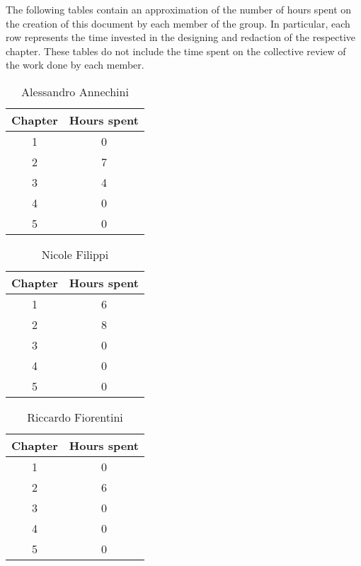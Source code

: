The following tables contain an approximation of the number of hours spent on the creation of this document by each member of the group. In particular, each row represents the time invested in the designing and redaction of the respective chapter. These tables do not include the time spent on the collective review of the work done by each member.

\begin{table}[h!]
  \centering
  \begin{tabular}{|c|c|}
    \hline
    Chapter & Hours spent \\
    \hline
    1 & 0\\
    \hline
    2 & 7\\
    \hline
    3 & 4\\
    \hline
    4 & 0\\
    \hline
    5 & 0\\
    \hline
  \end{tabular}
  \caption{Alessandro Annechini}
  \label{tab:Alessandro_Annechini_hours}
\end{table}

\begin{table}[h!]
  \centering
  \begin{tabular}{|c|c|}
    \hline
    Chapter & Hours spent \\
    \hline
    1 & 6\\
    \hline
    2 & 8\\
    \hline
    3 & 0\\
    \hline
    4 & 0\\
    \hline
    5 & 0\\
    \hline
  \end{tabular}
  \caption{Nicole Filippi}
  \label{tab:Nicole_Filippi_hours}
\end{table}

\begin{table}[h!]
  \centering
  \begin{tabular}{|c|c|}
    \hline
    Chapter & Hours spent \\
    \hline
    1 & 0\\
    \hline
    2 & 6\\
    \hline
    3 & 0\\
    \hline
    4 & 0\\
    \hline
    5 & 0\\
    \hline
  \end{tabular}
  \caption{Riccardo Fiorentini}
  \label{tab:Riccardo_Fiorentini_hours}
\end{table}